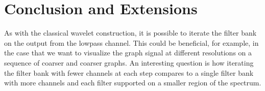 \documentclass[journal, 10pt]{IEEEtran}
\begin{document}
\section{Conclusion and Extensions}
\label{Sec:ongoing}
{\color{red} %




As with the classical wavelet construction, it is possible to iterate the filter bank on the output from the lowpass channel.
This could be beneficial, for example, in the case that we want to visualize the graph signal at different resolutions on  a sequence of coarser and coarser graphs. An interesting question is how iterating the filter bank with fewer channels at each step compares to a single filter bank with more channels and each filter supported on a smaller region of the spectrum.
}

\balance

{\small }
\end{document}
